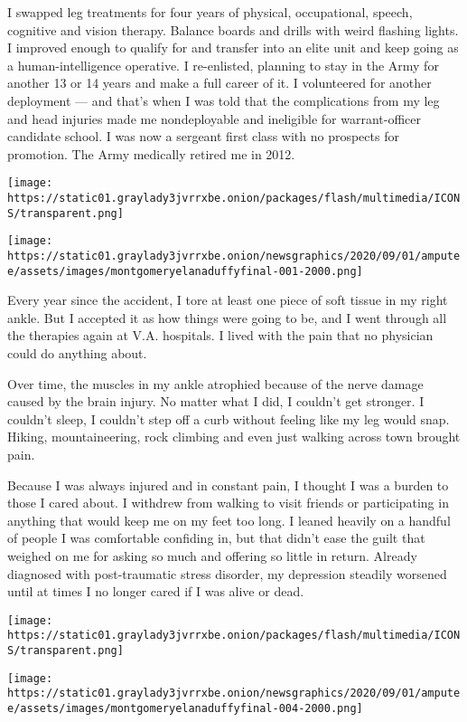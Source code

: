 I swapped leg treatments for four years of physical, occupational,
speech, cognitive and vision therapy. Balance boards and drills with
weird flashing lights. I improved enough to qualify for and transfer
into an elite unit and keep going as a human-intelligence operative. I
re-enlisted, planning to stay in the Army for another 13 or 14 years and
make a full career of it. I volunteered for another deployment --- and
that's when I was told that the complications from my leg and head
injuries made me nondeployable and ineligible for warrant-officer
candidate school. I was now a sergeant first class with no prospects for
promotion. The Army medically retired me in 2012.

\texttt{[image: https://static01.graylady3jvrrxbe.onion/packages/flash/multimedia/ICONS/transparent.png]}

\texttt{[image: https://static01.graylady3jvrrxbe.onion/newsgraphics/2020/09/01/amputee/assets/images/montgomeryelanaduffyfinal-001-2000.png]}

Every year since the accident, I tore at least one piece of soft tissue
in my right ankle. But I accepted it as how things were going to be, and
I went through all the therapies again at V.A. hospitals. I lived with
the pain that no physician could do anything about.

Over time, the muscles in my ankle atrophied because of the nerve damage
caused by the brain injury. No matter what I did, I couldn't get
stronger. I couldn't sleep, I couldn't step off a curb without feeling
like my leg would snap. Hiking, mountaineering, rock climbing and even
just walking across town brought pain.

Because I was always injured and in constant pain, I thought I was a
burden to those I cared about. I withdrew from walking to visit friends
or participating in anything that would keep me on my feet too long. I
leaned heavily on a handful of people I was comfortable confiding in,
but that didn't ease the guilt that weighed on me for asking so much and
offering so little in return. Already diagnosed with post-traumatic
stress disorder, my depression steadily worsened until at times I no
longer cared if I was alive or dead.

\texttt{[image: https://static01.graylady3jvrrxbe.onion/packages/flash/multimedia/ICONS/transparent.png]}

\texttt{[image: https://static01.graylady3jvrrxbe.onion/newsgraphics/2020/09/01/amputee/assets/images/montgomeryelanaduffyfinal-004-2000.png]}

